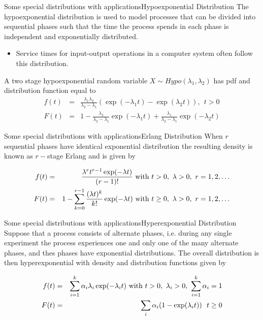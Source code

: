 \documentclass[handout]{beamer}
\begin{document}
\begin{frame}{Some special distributions with applications}{Hypoexponential Distribution}
The hypoexponential distribution is used to model processes that can be divided into sequential 
phases such that the time the process spends in each phase is independent and exponentially distributed.
\begin{itemize}
 \item Service times for input-output operations in a computer system often follow this distribution.
\end{itemize}
A two stage hypoexponential random variable $X \sim Hypo(\lambda_1,\lambda_2)$ has pdf and distribution function equal to
 \begin{eqnarray*}
f(t) &=& \frac{\lambda_1 \lambda_2}{\lambda_2 - \lambda_1} ( \exp(- \lambda_1 t) - \exp(\lambda_2 t) ), \ \ t> 0 \\ 
F(t) &=& 1 - \frac{\lambda_2}{\lambda_2 - \lambda_1} \exp(- \lambda_1 t) + \frac{\lambda_1}{\lambda_2 - \lambda_1}\exp(- \lambda_2 t)
 \end{eqnarray*}

\end{frame}

\begin{frame}{Some special distributions with applications}{Erlang Distribution}
When $r$ sequential phases have identical exponential distribution the resulting density is known as
$r-$stage Erlang and is given by

 \begin{eqnarray*}
f(t) &=& \frac{\lambda ^r t ^{r-1}  \exp(-\lambda t)}{(r-1)!}  \textnormal{ with } t>0, \ \lambda > 0, \ r=1,2,\dots \\ 
F(t) &=& 1 - \sum_{k=0}^{r-1} \frac{(\lambda t)^k}{k!} \exp(- \lambda t) \textnormal{ with } t \geq 0, \ \lambda > 0, \ r=1,2,\dots 
 \end{eqnarray*}

\end{frame}


\begin{frame}{Some special distributions with applications}{Hyperexponential Distribution}
Suppose that a process consists of alternate phases, i.e. during any single experiment the process 
experiences one and only one of the many alternate phases, and thes phases have exponential distributions.
The overall distribution is then hyperexponential with density and distribution functions given by

 \begin{eqnarray*}
f(t) &=& \sum_{i=1}^k \alpha_i \lambda_i \exp(-\lambda_i t)  \textnormal{ with } t>0, \ \lambda_i > 0, \ \sum_{i=1}^{k}\alpha_i=1\\ 
F(t) &=& \sum _i \alpha_i (1-\exp(\lambda_i t)) \ \ t \geq 0
 \end{eqnarray*}

\end{frame}
\end{document}
